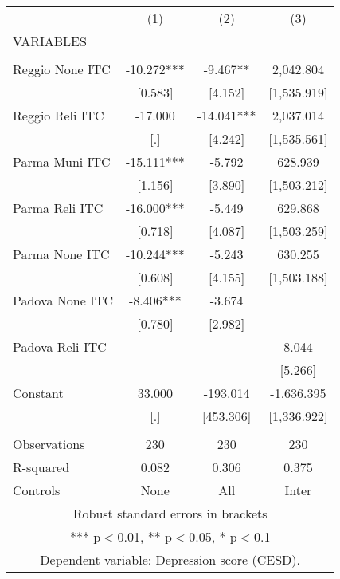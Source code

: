 \begin{tabular}{lccc} \hline
 & (1) & (2) & (3) \\
VARIABLES &  &  &  \\ \hline
 &  &  &  \\
Reggio None ITC & -10.272*** & -9.467** & 2,042.804 \\
 & [0.583] & [4.152] & [1,535.919] \\
Reggio Reli ITC & -17.000 & -14.041*** & 2,037.014 \\
 & [.] & [4.242] & [1,535.561] \\
Parma Muni ITC & -15.111*** & -5.792 & 628.939 \\
 & [1.156] & [3.890] & [1,503.212] \\
Parma Reli ITC & -16.000*** & -5.449 & 629.868 \\
 & [0.718] & [4.087] & [1,503.259] \\
Parma None ITC & -10.244*** & -5.243 & 630.255 \\
 & [0.608] & [4.155] & [1,503.188] \\
Padova None ITC & -8.406*** & -3.674 &  \\
 & [0.780] & [2.982] &  \\
Padova Reli ITC &  &  & 8.044 \\
 &  &  & [5.266] \\
Constant & 33.000 & -193.014 & -1,636.395 \\
 & [.] & [453.306] & [1,336.922] \\
 &  &  &  \\
Observations & 230 & 230 & 230 \\
R-squared & 0.082 & 0.306 & 0.375 \\
 Controls & None & All & Inter \\ \hline
\multicolumn{4}{c}{ Robust standard errors in brackets} \\
\multicolumn{4}{c}{ *** p$<$0.01, ** p$<$0.05, * p$<$0.1} \\
\multicolumn{4}{c}{ Dependent variable: Depression score (CESD).} \\
\end{tabular}
